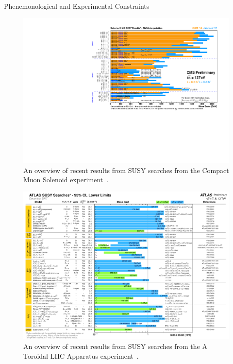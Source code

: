 \begin{section}{Phenemonological and Experimental Constraints}
\begin{figure}[tbp!]
\begin{center}
\includegraphics[angle=0,width=0.95\columnwidth]{fig/cms_susy_results.pdf}
\end{center}
\caption{An overview of recent results from SUSY searches from the Compact Muon Solenoid experiment~\cite{cms_susy_results}.}
\label{fig:cms_susy_results}
\end{figure}

\begin{figure}[tbp!]
\begin{center}
\includegraphics[angle=0,width=0.90\columnwidth]{fig/atlas_susy_results.pdf}
\end{center}
\caption{An overview of recent results from SUSY searches from the A Toroidal LHC Apparatus experiment~\cite{atlas_susy_results}.}
\label{fig:atlas_susy_results}
\end{figure}


\end{section}
